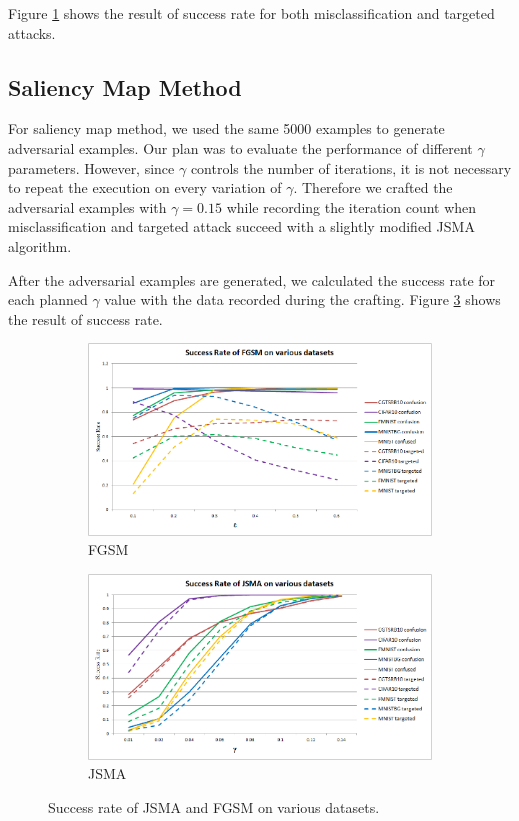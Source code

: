 \documentclass{article}
\begin{document}
Figure \ref{fig:fgsm} shows the result of success rate for both misclassification and targeted attacks.

\subsection{Saliency Map Method}

For saliency map method, we used the same 5000 examples to generate adversarial examples.
Our plan was to evaluate the performance of different \(\gamma\) parameters.
However, since \(\gamma\) controls the number of iterations, it is not necessary to repeat the execution
on every variation of \(\gamma\).
Therefore we crafted the adversarial examples with \(\gamma=0.15\) while 
recording the iteration count when misclassification and targeted attack succeed with a slightly modified JSMA algorithm.

After the adversarial examples are generated, we calculated the success rate for each planned \(\gamma\) value
with the data recorded during the crafting. Figure \ref{fig:jsma} shows the result of success rate.

\begin{figure}[t!]
    \centering
    \begin{subfigure}[b]{0.49\linewidth}
        \includegraphics[width=\linewidth]{fgsm}
        \caption{FGSM}
        \label{fig:fgsm}
    \end{subfigure}
    \begin{subfigure}[b]{0.49\linewidth}
        \includegraphics[width=\linewidth]{jsma}
        \caption{JSMA}
        \label{fig:jsma}
    \end{subfigure}
    \caption{Success rate of JSMA and FGSM on various datasets.}
\end{figure}
\end{document}
